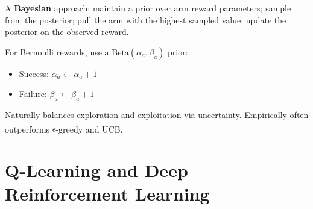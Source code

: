 \begin{tcbitemize}[ skin=sectionraster ]
        \tcbitem[title=Thompson Sampling, raster multicolumn=3]
        A \textbf{Bayesian} approach: maintain a prior over arm reward
        parameters; sample from the posterior; pull the arm with the highest
        sampled value; update the posterior on the observed reward.

        For Bernoulli rewards, use a $\text{Beta}(\alpha_a, \beta_a)$ prior:
        \begin{itemize}
            \item Success: $\alpha_a \leftarrow \alpha_a + 1$
            \item Failure: $\beta_a \leftarrow \beta_a + 1$
        \end{itemize}
        Naturally balances exploration and exploitation via uncertainty.
        Empirically often outperforms $\epsilon$-greedy and
        UCB.\textsuperscript{\cite[][p.~338]{hurbansGrokkingArtificialIntelligence2020}}

    \end{tcbitemize}


    \section{Q-Learning and Deep Reinforcement Learning}

